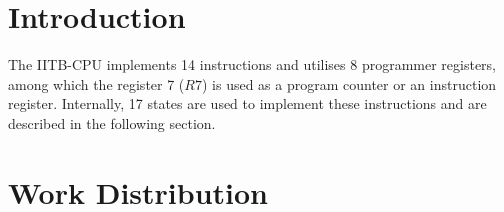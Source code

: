 \documentclass{article}
\begin{document}


\maketitle
\tableofcontents
\newpage
\section{Introduction}
The IITB-CPU implements 14 instructions and utilises 8 programmer registers, among which the register 7 ($R7$) is used as a program counter or an instruction register. Internally, 17 states are used to implement these instructions and are described in the following section.

\section{Work Distribution}
\end{document}
